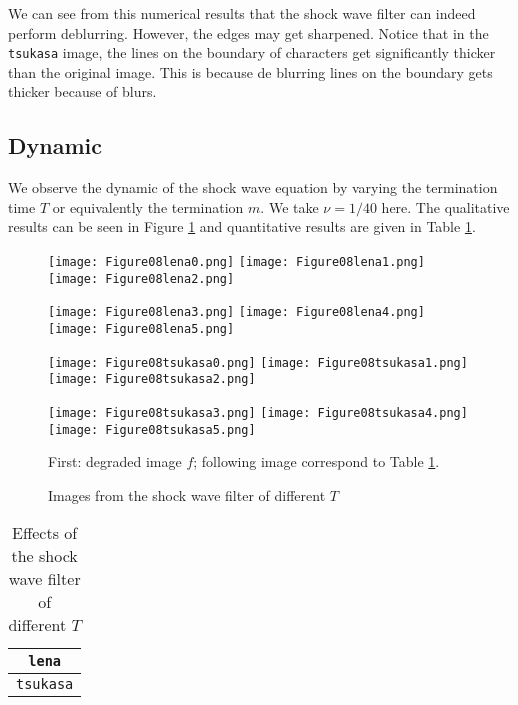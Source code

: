 \documentclass[english, nochinese]{pnote}
\begin{document}
We can see from this numerical results that the shock wave filter can indeed perform deblurring. However, the edges may get sharpened. Notice that in the \verb"tsukasa" image, the lines on the boundary of characters get significantly thicker than the original image. This is because de blurring lines on the boundary gets thicker because of blurs.

\subsection{Dynamic}

We observe the dynamic of the shock wave equation by varying the termination time $T$ or equivalently the termination $m$. We take $ \nu = 1 / 40 $ here. The qualitative results can be seen in Figure \ref{Fig:ShockDyn} and quantitative results are given in Table \ref{Tbl:ShockDyn}.

\begin{figure}[htbp]
{
\centering

\texttt{[image: Figure08lena0.png]}
\texttt{[image: Figure08lena1.png]}
\texttt{[image: Figure08lena2.png]}

\texttt{[image: Figure08lena3.png]}
\texttt{[image: Figure08lena4.png]}
\texttt{[image: Figure08lena5.png]}

\texttt{[image: Figure08tsukasa0.png]}
\texttt{[image: Figure08tsukasa1.png]}
\texttt{[image: Figure08tsukasa2.png]}

\texttt{[image: Figure08tsukasa3.png]}
\texttt{[image: Figure08tsukasa4.png]}
\texttt{[image: Figure08tsukasa5.png]}

\caption{Images from the shock wave filter of different $T$}
\label{Fig:ShockDyn}
}
{
\footnotesize First: degraded image $f$; following image correspond to Table \ref{Tbl:ShockDyn}.
}
\end{figure}

\begin{table}[htbp]
\centering
\begin{tabular}{|c|c|c|c|c|c|c|}
\hline
\multicolumn{7}{|c|}{\texttt{lena}} \\
\hline

\multicolumn{7}{|c|}{\texttt{tsukasa}} \\
\hline

\end{tabular}
\caption{Effects of the shock wave filter of different $T$}
\label{Tbl:ShockDyn}
\end{table}
\end{document}

